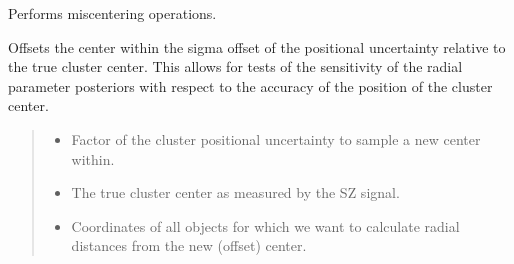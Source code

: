 \documentclass[letterpaper,12pt,english]{sphinxmanual}
\begin{document}
\begin{fulllineitems}
\begin{fulllineitems}
\label{\detokenize{api/mock:SPTclIRAGN.Mock_Generation.MockIRAGN._miscentering}}
\pysigstartsignatures
{}
\pysigstopsignatures
\sphinxAtStartPar
Performs miscentering operations.

\sphinxAtStartPar
Offsets the center within the sigma offset of the positional uncertainty relative to the true cluster center.
This allows for tests of the sensitivity of the radial parameter posteriors with respect to the accuracy of the
position of the cluster center.
\begin{quote}\begin{description}
\begin{itemize}
\item {} 
\sphinxAtStartPar
{} \textendash{} Factor of the cluster positional uncertainty to sample a new center within.

\item {} 
\sphinxAtStartPar
{} \textendash{} The true cluster center as measured by the SZ signal.

\item {} 
\sphinxAtStartPar
{} \textendash{} Coordinates of all objects for which we want to calculate radial distances from the new (offset) center.


\end{itemize}
\end{description}
\end{quote}
\end{fulllineitems}
\end{fulllineitems}
\end{document}
